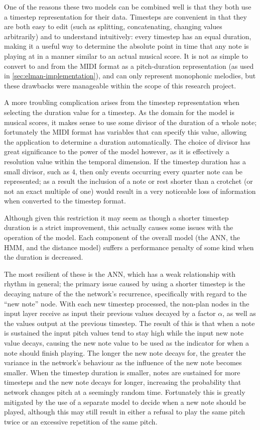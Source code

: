 \documentclass[ author={Stephen Livermore-Tozer},
				supervisor={Dr. Peter Flach},
				degree={MEng},
				title={Algorithmic Co-composition Using Machine Learning},
				subtitle={},
				type={research},
				year={2016} ]{dissertation}
\begin{document}
	One of the reasons these two models can be combined well is that they both use a timestep representation for their data. Timesteps are convenient in that they are both easy to edit (such as splitting, concatenating, changing values arbitrarily) and to understand intuitively: every timestep has an equal duration, making it a useful way to determine the absolute point in time that any note is playing at in a manner similar to an actual musical score. It is not as simple to convert to and from the MIDI format as a pitch-duration representation (as used in \ref{sec:elman-implementation}), and can only represent monophonic melodies, but these drawbacks were manageable within the scope of this research project.
	
	A more troubling complication arises from the timestep representation when selecting the duration value for a timestep. As the domain for the model is musical scores, it makes sense to use some divisor of the duration of a whole note; fortunately the MIDI format has variables that can specify this value, allowing the application to determine a duration automatically. The choice of divisor has great significance to the power of the model however, as it is effectively a resolution value within the temporal dimension. If the timestep duration has a small divisor, such as 4, then only events occurring every quarter note can be represented; as a result the inclusion of a note or rest shorter than a crotchet (or not an exact multiple of one) would result in a very noticeable loss of information when converted to the timestep format. 
	
	
	Although given this restriction it may seem as though a shorter timestep duration is a strict improvement, this actually causes some issues with the operation of the model. Each component of the overall model (the ANN, the HMM, and the distance model) suffers a performance penalty of some kind when the duration is decreased.
	
	The most resilient of these is the ANN, which has a weak relationship with rhythm in general; the primary issue caused by using a shorter timestep is the decaying nature of the the network's recurrence, specifically with regard to the ``new note'' node. With each new timestep processed, the non-plan nodes in the input layer receive as input their previous values decayed by a factor $\alpha$, as well as the values output at the previous timestep. The result of this is that when a note is sustained the input pitch values tend to stay high while the input new note value decays, causing the new note value to be used as the indicator for when a note should finish playing. The longer the new note decays for, the greater the variance in the network's behaviour as the influence of the new note becomes smaller. When the timestep duration is smaller, notes are sustained for more timesteps and the new note decays for longer, increasing the probability that network changes pitch at a seemingly random time. Fortunately this is greatly mitigated by the use of a separate model to decide when a new note should be played, although this may still result in either a refusal to play the same pitch twice or an excessive repetition of the same pitch.
	
\end{document}
